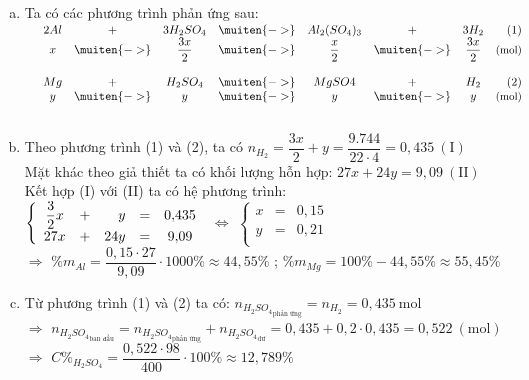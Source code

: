 \setlength{\baselineskip}{1.12\baselineskip}
\begin{enumerate}[a)]
	\item \noindent  Ta có các phương trình phản ứng sau:\\
	$\begin{array}{lcccccccr}
		&2Al& +& 3H_2SO_4 &\muiten{->}& Al_2({SO_4})_3& + & 3H_2 &(1)\\
		& x &\muiten{->}& \dfrac{3x}{2} &\muiten{->}&\dfrac{x}{2}&\muiten{->}& \dfrac{3x}{2} & \small\text{(mol)}\\
		& & &  & & & &  &\\
		& Mg & +& H_2SO_4 &\muiten{->}& MgSO4& + & H_2 & (2)\\
		&y &\muiten{->}& y &\muiten{->}& y &\muiten{->}& y & \small\text{(mol)}\\
		& & &  & & & &  &\\
	\end{array}$\\
	\item Theo phương trình (1) và (2), ta có $n_{H_2} = \dfrac{3x}{2} + y = \dfrac{9.744}{22\cdot4} = 0{,}435\mathrm{~(I)} $\\
	Mặt khác theo giả thiết ta có khối lượng hỗn hợp:
	$27x + 24y = 9{,}09\mathrm{~(II)}$\\
	Kết hợp (I) với (II) ta có hệ phương trình: \\
	$\left\{
	\begin{array}{*{6}c}
		\dfrac{3}{2}x& + & \phantom{24}y & = & 0{,}435\\
		 27x & + & 24y& = & 9{,}09 \\
	\end{array}
	\right.$ 
	$\Leftrightarrow$
	$\left\{\begin{array}{ccc}
		x& = & 0{,}15\\
		y& = & 0{,}21 \\
	\end{array}\right.$ \\
	$\Rightarrow$ $\% m_{Al} =\dfrac{0{,}15\cdot 27}{9{,}09}\cdot 1000\% \approx 44{,}55\%$ ; $\% m_{Mg} = 100\% - 44{,}55\% \approx 55{,}45\%$
	\item Từ phương trình (1) và (2) ta có: $n_{{H_2SO_4}_{\text{phản ứng}}} = n_{H_2} = 0{,}435 \mathrm{~mol}$\\
	$\Rightarrow$ $n_{{H_2SO_4}_{\text{ban đầu}}} = n_{{H_2SO_4}_{\text{phản ứng}}} + n_{{H_2SO_4}_{\text{dư}}} = 0{,}435 + 0{,}2\cdot 0{,}435 = 0{,}522\mathrm{~(mol)}   $\\
	$\Rightarrow$ ${C\%}_{H_2SO_4}= \dfrac{0{,}522\cdot98}{400}\cdot 100\% \approx 12{,}789 \%$
\end{enumerate}


